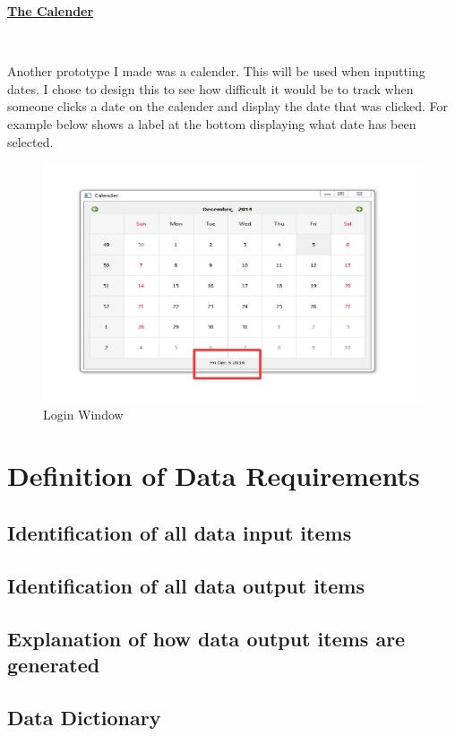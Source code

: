 \newpage

\underline {\textbf{The Calender}}

\

Another prototype I made was a calender. This will be used when inputting dates. I chose to design this to see how difficult it would be to track when someone clicks a date on the calender and display the date that was clicked. For example below shows a label at the bottom displaying what date has been selected.

\begin{figure}[H]
\includegraphics[width=\textwidth]{Calender.jpg}
\caption{Login Window}
\end{figure}


\section{Definition of Data Requirements}

\subsection{Identification of all data input items}

\subsection{Identification of all data output items}

\subsection{Explanation of how data output items are generated}

\subsection{Data Dictionary}

